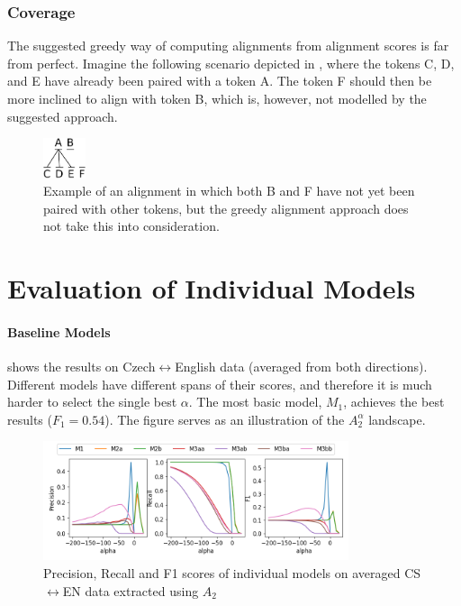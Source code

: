 \subsubsection*{Coverage}

The suggested greedy way of computing alignments from alignment scores is far from perfect. Imagine the following scenario depicted in , where the tokens C, D, and E have already been paired with a token A. The token F should then be more inclined to align with token B, which is, however, not modelled by the suggested approach.

\begin{figure}[h!]
    \center
    \includegraphics[width=0.11\textwidth]{img/alignment_coverage.pdf}
    \caption{
        Example of an alignment in which both B and F have not yet been paired with other tokens, but the greedy alignment approach does not take this into consideration.
        \label{fig:alignment_coverage}
    }
\end{figure}

\section{Evaluation of Individual Models}

\paragraph{Baseline Models}  shows the results on Czech$\leftrightarrow$English data (averaged from both directions). Different models have different spans of their scores, and therefore it is much harder to select the single best $\alpha$. The most basic model, $M_1$, achieves the best results ($F_1 = 0.54$). The figure serves as an illustration of the $A_2^\alpha$ landscape.

\begin{figure}[h!]
    \center
    \includegraphics[width=0.8\textwidth]{img/individual_encs_mix_a2.png}
    \caption{Precision, Recall and F1 scores of individual models on averaged CS$\leftrightarrow$EN data extracted using $A_2$ \label{fig:individual_encs_mix_a2}}
\end{figure}

